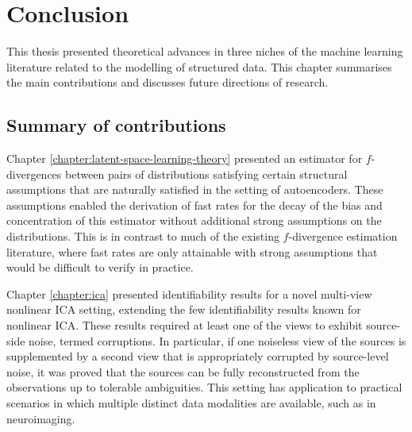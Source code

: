 \chapter{Conclusion}\label{chapter:conclusion}

\ifpdf
    \graphicspath{{Chapter7/Figs/Raster/}{Chapter7/Figs/PDF/}{Chapter7/Figs/}}
\else
    \graphicspath{{Chapter7/Figs/Vector/}{Chapter7/Figs/}}
\fi

This thesis presented theoretical advances in three niches of the machine learning literature related to the modelling of structured data.
This chapter summarises the main contributions and discusses future directions of research.

\section{Summary of contributions}

Chapter \ref{chapter:latent-space-learning-theory} presented an estimator for $f$-divergences between pairs of distributions satisfying certain structural assumptions that are naturally satisfied in the setting of autoencoders. 
These assumptions enabled the derivation of fast rates for the decay of the bias and concentration of this estimator without additional strong assumptions on the distributions.
This is in contrast to much of the existing $f$-divergence estimation literature, where fast rates are only attainable with strong assumptions that would be difficult to verify in practice.


Chapter \ref{chapter:ica} presented identifiability results for a novel multi-view nonlinear ICA setting, extending the few identifiability results known for nonlinear ICA.
These results required at least one of the views to exhibit source-side noise, termed corruptions.
In particular, if one noiseless view of the sources is supplemented by a second view that is appropriately corrupted by source-level noise, it was proved that the sources can be fully reconstructed from the observations up to tolerable ambiguities.
This setting has application to practical scenarios in which multiple distinct data modalities are available, such as in neuroimaging. %


